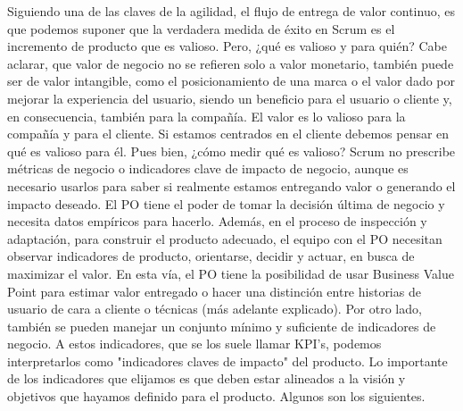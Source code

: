 Siguiendo una de las claves de la agilidad, el flujo de entrega de valor continuo, es que podemos suponer que la verdadera medida de éxito en Scrum es el incremento de producto que es valioso. Pero, ¿qué es valioso y para quién? Cabe aclarar, que valor de negocio no se refieren solo a valor monetario, también puede ser de valor intangible, como el posicionamiento de una marca o el valor dado por mejorar la experiencia del usuario, siendo un beneficio para el usuario o cliente y, en consecuencia, también para la compañía. El valor es lo valioso para la compañía y para el cliente. Si estamos centrados en el cliente debemos pensar en qué es valioso para él. Pues bien, ¿cómo medir qué es valioso?
Scrum no prescribe métricas de negocio o indicadores clave de impacto de negocio, aunque es necesario usarlos para saber si realmente estamos entregando valor o generando el impacto deseado. El PO tiene el poder de tomar la decisión última de negocio y necesita datos empíricos para hacerlo. Además, en el proceso de inspección y adaptación, para construir el producto adecuado, el equipo con el PO necesitan observar indicadores de producto, orientarse, decidir y actuar, en busca de maximizar el valor. En esta vía, el PO tiene la posibilidad de usar Business Value Point para estimar valor entregado o hacer una distinción entre historias de usuario de cara a cliente o técnicas (más adelante explicado). Por otro lado, también se pueden manejar un conjunto mínimo y suficiente de indicadores de negocio. A estos indicadores, que se los suele llamar KPI's, podemos interpretarlos como "indicadores claves de impacto" del producto. Lo importante de los indicadores que elijamos es que deben estar alineados a la visión y objetivos que hayamos definido para el producto.
Algunos son los siguientes.



